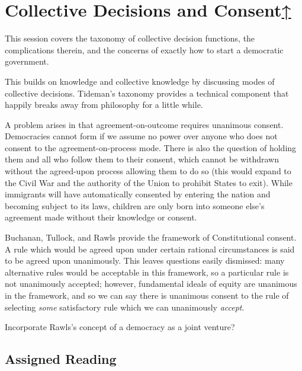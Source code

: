 \label{cur:collective-decisions-consent}
\section{Collective Decisions and Consent\hyperref[syllabus]{↑}}

This session covers the taxonomy of collective decision functions, the complications therein, and the concerns of exactly how to start a democratic government.

This builds on knowledge and collective knowledge by discussing modes of collective decisions.  Tideman's taxonomy provides a technical component that happily breaks away from philosophy for a little while.

A problem arises in that agreement-on-outcome requires unanimous consent.  Democracies cannot form if we assume no power over anyone who does not consent to the agreement-on-process mode.  There is also the question of holding them and all who follow them to their consent, which cannot be withdrawn without the agreed-upon process allowing them to do so (this would expand to the Civil War and the authority of the Union to prohibit States to exit).  While immigrants will have automatically consented by entering the nation and becoming subject to its laws, children are only born into someone else's agreement made without their knowledge or consent.

Buchanan, Tullock, and Rawls provide the framework of Constitutional consent.  A rule which would be agreed upon under certain rational circumstances is said to be agreed upon unanimously.  This leaves questions easily dismissed:  many alternative rules would be acceptable in this framework, so a particular rule is not unanimously accepted; however, fundamental ideals of equity are unanimous in the framework, and so we can say there is unanimous consent to the rule of selecting \textit{some} satisfactory rule which we can unanimously \textit{accept}.


\begin{todo}
    Incorporate Rawls's concept of a democracy as a joint venture?
\end{todo}

\subsection{Assigned Reading}

